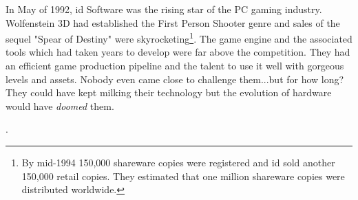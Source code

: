 In May of 1992, id Software was the rising star of the PC gaming industry. Wolfenstein 3D had established the First
Person Shooter genre and sales of the sequel "Spear of Destiny" were skyrocketing\footnote{By mid-1994 150,000 shareware copies were registered and id sold another 150,000 retail copies. They estimated that one million shareware copies were distributed worldwide.}. The game engine and the associated  tools which had taken years to develop were far above the competition. They had an efficient game production pipeline and the talent to use it well with gorgeous levels and assets. Nobody even came close to challenge them...but for how long? They could have kept milking their technology but the evolution of hardware would have \textit{doomed} them.\\
\par

\par
{}. \\
\par


